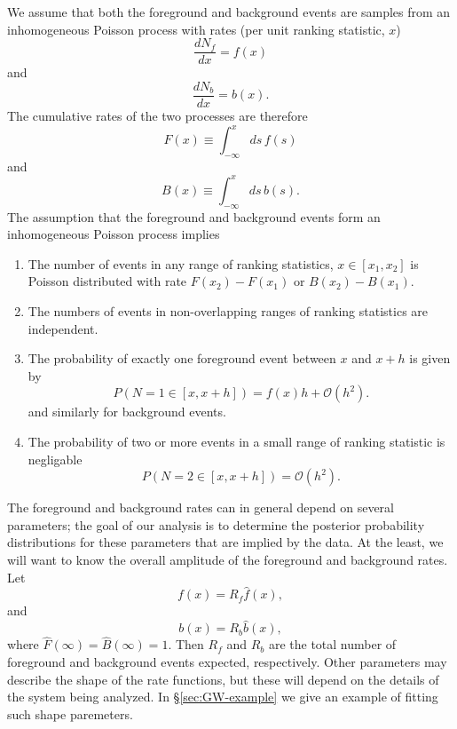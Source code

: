 \documentclass[aps,prd,reprint]{revtex4-1}
\newcommand{\order}[1]{\mathcal{O}\left( #1 \right)}
\begin{document}
We assume that both the foreground and background events are samples
from an inhomogeneous Poisson process with rates (per unit ranking
statistic, $x$)
\begin{equation}
  \frac{dN_f}{dx} = f(x)
\end{equation}
and 
\begin{equation}
  \frac{dN_b}{dx} = b(x).
\end{equation}
The cumulative rates of the two processes are therefore
\begin{equation}
  F(x) \equiv \int_{-\infty}^x ds\, f(s)
\end{equation}
and
\begin{equation}
  B(x) \equiv \int_{-\infty}^x ds\, b(s).
\end{equation}
The assumption that the foreground and background events form an
inhomogeneous Poisson process implies
\begin{enumerate}
\item The number of events in any range of ranking statistics, $x \in
  [x_1, x_2]$ is Poisson distributed with rate $F(x_2) - F(x_1)$ or
  $B(x_2) - B(x_1)$.
\item The numbers of events in non-overlapping ranges of ranking
  statistics are independent. 
\item The probability of exactly one foreground event between $x$ and
  $x+h$ is given by
  \begin{equation}
    P(N = 1 \in [x, x+h]) = f(x) h + \order{h^2}.
  \end{equation}
  and similarly for background events.
\item The probability of two or more events in a small range of
  ranking statistic is negligable
  \begin{equation}
    P(N = 2 \in [x, x+h]) = \order{h^2}.
  \end{equation}
\end{enumerate}
The foreground and background rates can in general depend on several
parameters; the goal of our analysis is to determine the posterior
probability distributions for these parameters that are implied by the
data.  At the least, we will want to know the overall amplitude of the
foreground and background rates.  Let
\begin{equation}
  f(x) = R_f \hat{f}(x),
\end{equation}
and 
\begin{equation}
  b(x) = R_b \hat{b}(x),
\end{equation}
where $\hat{F}(\infty) = \hat{B}(\infty) = 1$.  Then $R_f$ and $R_b$
are the total number of foreground and background events expected,
respectively.  Other parameters may describe the shape of the rate
functions, but these will depend on the details of the system being
analyzed.  In \S \ref{sec:GW-example} we give an example of fitting
such shape paremeters.
\end{document}
